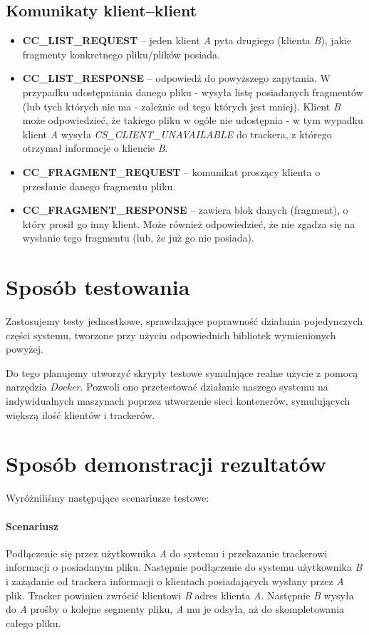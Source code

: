 \documentclass[11pt]{article}
\begin{document}
\subsection{Komunikaty klient--klient}
\begin{itemize}
\item \textbf{CC\_LIST\_REQUEST} -- jeden klient \textsl{A} pyta drugiego (klienta \textsl{B}), jakie fragmenty konkretnego pliku/plików posiada.
\item \textbf{CC\_LIST\_RESPONSE} -- odpowiedź do powyższego zapytania. W przypadku udostępniania danego pliku - wysyła listę posiadanych fragmentów (lub tych których nie ma - zależnie od tego których jest mniej). Klient \textsl{B} może odpowiedzieć, że takiego pliku w ogóle nie udostępnia - w tym wypadku klient \textsl{A} wysyła \textsl{CS\_CLIENT\_UNAVAILABLE} do trackera, z którego otrzymał informacje o kliencie \textsl{B}.
\item \textbf{CC\_FRAGMENT\_REQUEST} -- komunikat proszący klienta o przesłanie danego fragmentu pliku.
\item \textbf{CC\_FRAGMENT\_RESPONSE} -- zawiera blok danych (fragment), o który prosił go inny klient. Może również odpowiedzieć, że nie zgadza się na wysłanie tego fragmentu (lub, że już go nie posiada).
\end{itemize}


\section{Sposób testowania}
Zastosujemy testy jednostkowe, sprawdzające poprawność działania pojedynczych części systemu, tworzone przy użyciu odpowiednich bibliotek wymienionych powyżej.

Do tego planujemy utworzyć skrypty testowe symulujące realne użycie z pomocą narzędzia \textsl{Docker}. Pozwoli ono przetestować działanie naszego systemu na indywidualnych maszynach poprzez utworzenie sieci kontenerów, symulujących większą ilość klientów i trackerów.

\newcommand{\RomanNumeralCaps}[1]
    {\MakeUppercase{\romannumeral #1}}
\section{Sposób demonstracji rezultatów}
Wyróżniliśmy następujące scenariusze testowe:
\paragraph{Scenariusz \RomanNumeralCaps{1}} Podłączenie się przez użytkownika \textsl{A} do systemu i przekazanie trackerowi informacji o posiadanym pliku. Następnie podłączenie do systemu użytkownika \textsl{B} i zażądanie od trackera informacji o klientach posiadających wysłany przez \textsl{A} plik. Tracker powinien zwrócić klientowi \textsl{B} adres klienta \textsl{A}. Następnie \textsl{B} wysyła do \textsl{A} prośby o kolejne segmenty pliku, \textsl{A} mu je odsyła, aż do skompletowania całego pliku.
\end{document}
